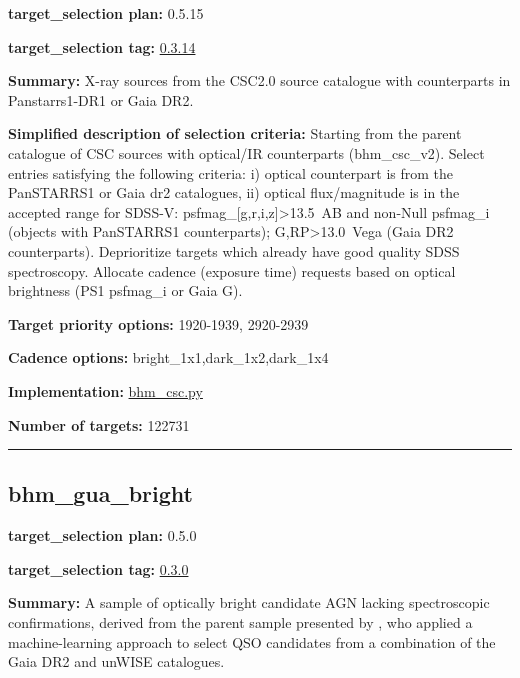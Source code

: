 \noindent\textbf{target\_selection plan:} 0.5.15

\noindent\textbf{target\_selection tag:}
\href{https://github.com/sdss/target_selection/tree/0.3.14/}{0.3.14}

\noindent\textbf{Summary:} X-ray sources from the CSC2.0 source catalogue with
counterparts in Panstarrs1-DR1 or Gaia DR2.

\noindent\textbf{Simplified description of selection criteria:} Starting from the
parent catalogue of CSC sources with optical/IR counterparts
(bhm\_csc\_v2). Select entries satisfying the following criteria: i)
optical counterpart is from the PanSTARRS1 or Gaia dr2 catalogues, ii)
optical flux/magnitude is in the accepted range for SDSS-V:
psfmag\_{[}g,r,i,z{]}\textgreater13.5~AB and non-Null psfmag\_i (objects
with PanSTARRS1 counterparts); G,RP\textgreater13.0~Vega (Gaia DR2
counterparts). Deprioritize targets which already have good quality SDSS
spectroscopy. Allocate cadence (exposure time) requests based on optical
brightness (PS1 psfmag\_i or Gaia G).


\noindent\textbf{Target priority options:} 1920-1939, 2920-2939

\noindent\textbf{Cadence options:} bright\_1x1,dark\_1x2,dark\_1x4

\noindent\textbf{Implementation:}
\href{https://github.com/sdss/target_selection/blob/0.3.14/python/target_selection/cartons/bhm_csc.py}{bhm\_csc.py}

\noindent\textbf{Number of targets:} 122731

\begin{center}\rule{0.5\linewidth}{0.5pt}\end{center}

\hypertarget{bhm_gua_bright_plan0.5.0}{%
\subsection{bhm\_gua\_bright}\label{bhm_gua_bright_plan0.5.0}}

\noindent\textbf{target\_selection plan:} 0.5.0

\noindent\textbf{target\_selection tag:}
\href{https://github.com/sdss/target_selection/tree/0.3.0/}{0.3.0}

\noindent\textbf{Summary:} A sample of optically bright candidate AGN lacking
spectroscopic confirmations, derived from the parent sample presented by
\citet{Shu2019}, who applied a machine-learning approach to select QSO
candidates from a combination of the Gaia DR2 and unWISE catalogues.

